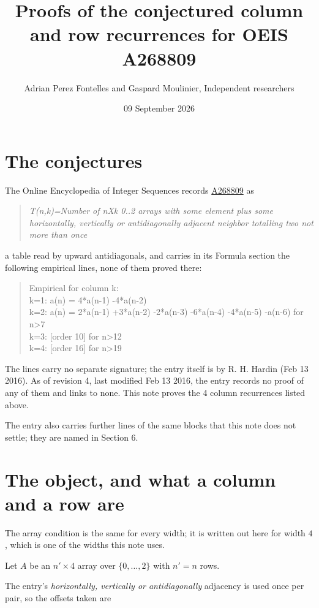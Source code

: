 \documentclass[11pt]{article}
\title{Proofs of the conjectured column and row recurrences for OEIS A268809}
\author{Adrian Perez Fontelles and Gaspard Moulinier, Independent researchers}
\date{09 September 2026}
\theoremstyle{definition}
\begin{document}
\maketitle
\section{The conjectures}

The Online Encyclopedia of Integer Sequences records \href{https://oeis.org/A268809}{A268809} as

\begin{quote}\itshape T(n,k)=Number of nXk 0..2 arrays with some element plus some horizontally, vertically or antidiagonally adjacent neighbor totalling two not more than once\end{quote}

a table read by upward antidiagonals, and carries in its Formula section the following empirical lines, none of them proved there:

\begin{quote}\ttfamily Empirical for column k:\\
k=1: a(n) = 4*a(n-1) -4*a(n-2)\\k=2: a(n) = 2*a(n-1) +3*a(n-2) -2*a(n-3) -6*a(n-4) -4*a(n-5) -a(n-6) for n>7\\k=3: [order 10] for n>12\\k=4: [order 16] for n>19\end{quote}

The lines carry no separate signature; the entry itself is by R. H. Hardin (Feb 13 2016). As of revision 4, last modified Feb 13 2016, the entry records no proof of any of them and links to none. This note proves the 4 column recurrences listed above.

The entry also carries further lines of the same blocks that this note does not settle; they are named in Section 6.

\section{The object, and what a column and a row are}

The array condition is the same for every width; it is written out here for width $4$, which is one of the widths this note uses.

Let $A$ be an $n' \times 4$ array over $\{0,\dots,2\}$ with $n' = n$ rows.

The entry's {\itshape horizontally, vertically or antidiagonally} adjacency is used once per pair, so the offsets taken are
\end{document}
